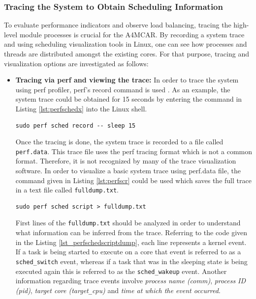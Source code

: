 \subsubsection{Tracing the System to Obtain Scheduling Information}
To evaluate performance indicators and observe load balancing, tracing the high-level module processes is crucial for the A4MCAR. By recording a system trace and using scheduling visualization tools in Linux, one can see how processes and threads are distributed amongst the existing cores. For that purpose, tracing and visualization options are investigated as follows:
\begin{itemize}
	\item \textbf{Tracing via perf and viewing the trace:}
	In order to trace the system using perf profiler, perf's record command is used \cite{perf2}. As an example, the system trace could be obtained for 15 seconds by entering the command in Listing \ref{lst:perfschedx} into the Linux shell.
	\begin{lstlisting}[caption={Using perf sched record},label={lst:perfschedx},style=bash]
		sudo perf sched record -- sleep 15
	\end{lstlisting}
	Once the tracing is done, the system trace is recorded to a file called \texttt{perf.data}. This trace file uses the perf tracing format which is not a common format. Therefore, it is not recognized by many of the trace visualization software. In order to visualize a basic system trace using perf.data file, the command given in Listing \ref{lst:perfscr} could be used which saves the full trace in a text file called \texttt{fulldump.txt}.
	\begin{lstlisting}[caption={Using perf sched script to get full dump of scheduling in Linux},label={lst:perfscr},style=bash]
		sudo perf sched script > fulldump.txt
	\end{lstlisting}
	First lines of the \texttt{fulldump.txt} should be analyzed in order to understand what information can be inferred from the trace. Referring to the code given in the Listing \ref{lst_perfschedscriptdump}, each line represents a kernel event. If a task is being started to execute on a core that event is referred to as a \texttt{sched\texttt{\_}switch} event, whereas if a task that was in the sleeping state is being executed again this is referred to as the \texttt{sched\texttt{\_}wakeup} event. Another information regarding trace events involve \textit{process name (comm)}, \textit{process ID (pid)}, \textit{target core (target\texttt{\_}cpu)} and \textit{time at which the event occurred}. 
	
	

\end{itemize}
